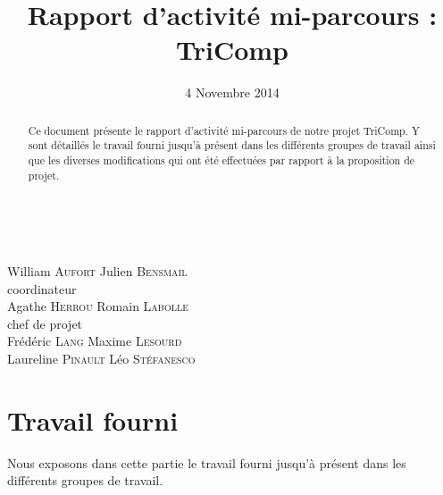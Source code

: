 \documentclass{article}
\title{Rapport d'activité mi-parcours : TriComp}
\author{}
\date{4 Novembre 2014}
\begin{document}
\makeatletter %
  \begin{titlepage}
    \begin{center}
       {\LARGE \@title} \\
       \vspace{2cm}
       {\large \@date}
       \vspace{3cm}
    \end{center}
       {\large
       {William \textsc{Aufort} \hfill Julien \textsc{Bensmail} \\}
    \vspace{1cm}
       {\hfill coordinateur \\}
       {Agathe \textsc{Herrou}  \hfill Romain \textsc{Labolle} \\}
       \vspace{1cm}
       {chef de projet \\}
       \vspace{1.5cm}
       {Frédéric \textsc{Lang} \hfill Maxime \textsc{Lesourd} \\}
       {Laureline \textsc{Pinault} \hfill Léo \textsc{Stéfanesco} \\}}
       \vspace{2.5cm}
    \begin{abstract}
	Ce document présente le rapport d'activité mi-parcours de notre projet TriComp. Y sont détaillés le travail fourni jusqu'à présent
dans les différents groupes de travail ainsi que les diverses modifications qui ont été effectuées par rapport à la proposition de projet.
    \end{abstract}
  \end{titlepage}
\makeatother


\newpage

\tableofcontents

\newpage


\section{Travail fourni}

Nous exposons dans cette partie le travail fourni jusqu'à présent dans les différents groupes de travail.
\end{document}
